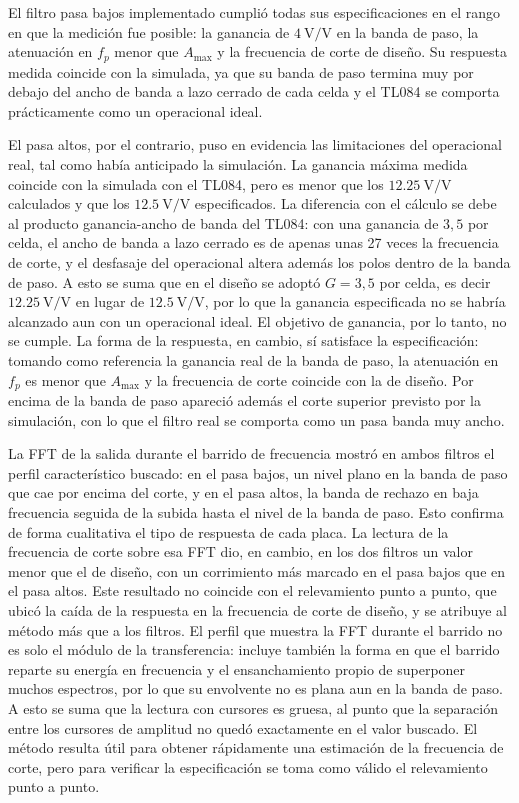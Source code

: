 El filtro pasa bajos implementado cumplió todas sus especificaciones en el rango en que la medición fue posible: la
ganancia de $\SI{4}{\volt/\volt}$ en la banda de paso, la atenuación en $f_p$ menor que $A_{\max}$ y la frecuencia de
corte de diseño. Su respuesta medida coincide con la simulada, ya que su banda de paso termina muy por debajo del
ancho de banda a lazo cerrado de cada celda y el TL084 se comporta prácticamente como un operacional ideal.

El pasa altos, por el contrario, puso en evidencia las limitaciones del operacional real, tal como había anticipado
la simulación. La ganancia máxima medida coincide con la simulada con el TL084, pero es menor que los $\SI{12.25}{\volt/\volt}$ calculados y que los $\SI{12.5}{\volt/\volt}$ especificados. La diferencia con
el cálculo se debe al producto ganancia-ancho de banda del TL084: con una ganancia de $3{,}5$ por celda, el ancho de
banda a lazo cerrado es de apenas unas 27 veces la frecuencia de corte, y el desfasaje del operacional altera además
los polos dentro de la banda de paso. A esto se suma que en el diseño se adoptó $G = 3{,}5$ por celda, es decir
$\SI{12.25}{\volt/\volt}$ en lugar de $\SI{12.5}{\volt/\volt}$, por lo que la ganancia especificada no se habría
alcanzado aun con un operacional ideal. El objetivo de ganancia, por lo tanto, no se cumple. La forma de la respuesta,
en cambio, sí satisface la especificación: tomando como referencia la ganancia real de la banda de paso, la
atenuación en $f_p$ es menor que $A_{\max}$ y la frecuencia de corte coincide con la de diseño. Por encima de la banda
de paso apareció además el corte superior previsto por la simulación, con lo que el filtro real se comporta como un
pasa banda muy ancho.

La FFT de la salida durante el barrido de frecuencia mostró en ambos filtros el perfil característico buscado: en el
pasa bajos, un nivel plano en la banda de paso que cae por encima del corte, y en el pasa altos, la banda de rechazo
en baja frecuencia seguida de la subida hasta el nivel de la banda de paso. Esto confirma de forma cualitativa el tipo
de respuesta de cada placa. La lectura de la frecuencia de corte sobre esa FFT dio, en cambio, en los dos filtros un
valor menor que el de diseño, con un corrimiento más marcado en el pasa bajos que en el pasa altos. Este resultado no coincide con
el relevamiento punto a punto, que ubicó la caída de la respuesta en la frecuencia de corte de diseño, y se atribuye
al método más que a los filtros. El perfil que muestra la FFT durante el barrido no es solo el módulo de la
transferencia: incluye también la forma en que el barrido reparte su energía en frecuencia y el ensanchamiento propio
de superponer muchos espectros, por lo que su envolvente no es plana aun en la banda de paso. A esto se suma que la
lectura con cursores es gruesa, al punto que la separación entre los cursores de amplitud no quedó exactamente en el
valor buscado. El método resulta útil para obtener rápidamente una estimación de la frecuencia de corte, pero para
verificar la especificación se toma como válido el relevamiento punto a punto.

